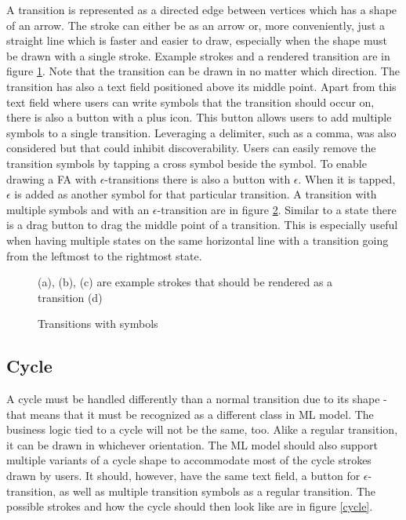 A transition is represented as a directed edge between vertices which has a shape of an arrow. The stroke can either be as an arrow or, more conveniently, just a straight line which is faster and easier to draw, especially when the shape must be drawn with a single stroke. Example strokes and a rendered transition are in figure \ref{transition}. Note that the transition can be drawn in no matter which direction. The transition has also a text field positioned above its middle point. Apart from this text field where users can write symbols that the transition should occur on, there is also a button with a plus icon. This button allows users to add multiple symbols to a single transition. Leveraging a delimiter, such as a comma, was also considered but that could inhibit discoverability. Users can easily remove the transition symbols by tapping a cross symbol beside the symbol. To enable drawing a FA with $\epsilon$-transitions there is also a button with $\epsilon$. When it is tapped, $\epsilon$ is added as another symbol for that particular transition. A transition with multiple symbols and with an $\epsilon$-transition are in figure \ref{transition-symbols}. Similar to a state there is a drag button to drag the middle point of a transition. This is especially useful when having multiple states on the same horizontal line with a transition going from the leftmost to the rightmost state.

\begin{figure}
    \centering
    \caption{(a), (b), (c) are example strokes that should be rendered as a transition (d)}\label{transition}
\end{figure}

\begin{figure}
    \centering
    \caption{Transitions with symbols}\label{transition-symbols}
\end{figure}

\subsection{Cycle}

A cycle must be handled differently than a normal transition due to its shape - that means that it must be recognized as a different class in ML model. The business logic tied to a cycle will not be the same, too. Alike a regular transition, it can be drawn in whichever orientation. The ML model should also support multiple variants of a cycle shape to accommodate most of the cycle strokes drawn by users. It should, however, have the same text field, a button for $\epsilon$-transition, as well as multiple transition symbols as a regular transition. The possible strokes and how the cycle should then look like are in figure \ref{cycle}.

